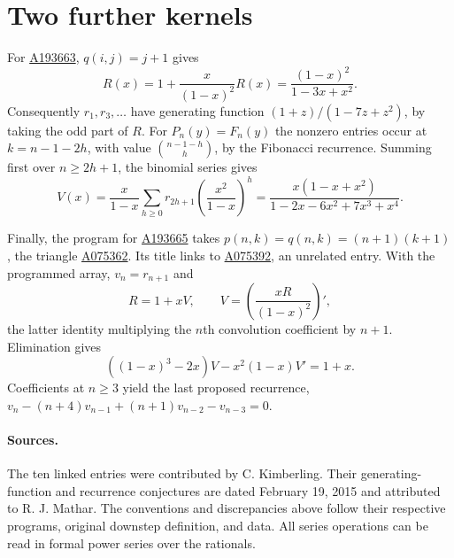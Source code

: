 \documentclass[11pt,letterpaper]{article}
\newcommand{\oeis}[1]{\href{https://oeis.org/A#1}{A#1}}
\begin{document}
\section{Two further kernels}
For \oeis{193663}, $q(i,j)=j+1$ gives
\[
 R(x)=1+\frac{x}{(1-x)^2}R(x)=\frac{(1-x)^2}{1-3x+x^2}.
\]
Consequently $r_1,r_3,\ldots$ have generating function $(1+z)/(1-7z+z^2)$, by taking the odd part of $R$. For $P_n(y)=F_n(y)$ the nonzero entries occur at $k=n-1-2h$, with value $\binom{n-1-h}{h}$, by the Fibonacci recurrence. Summing first over $n\ge2h+1$, the binomial series gives
\[
 V(x)=\frac{x}{1-x}\sum_{h\ge0}r_{2h+1}
                  \left(\frac{x^2}{1-x}\right)^h
     =\frac{x(1-x+x^2)}{1-2x-6x^2+7x^3+x^4}.
\]

Finally, the program for \oeis{193665} takes $p(n,k)=q(n,k)=(n+1)(k+1)$, the triangle \oeis{075362}. Its title links to \oeis{075392}, an unrelated entry. With the programmed array, $v_n=r_{n+1}$ and
\[
  R=1+xV,\qquad V=\left(\frac{xR}{(1-x)^2}\right)' ,
\]
the latter identity multiplying the $n$th convolution coefficient by $n+1$. Elimination gives
\[
 ((1-x)^3-2x)V-x^2(1-x)V'=1+x.
\]
Coefficients at $n\ge3$ yield the last proposed recurrence,
$v_n-(n+4)v_{n-1}+(n+1)v_{n-2}-v_{n-3}=0$.

\paragraph{Sources.}
The ten linked entries were contributed by C. Kimberling. Their generating-function and recurrence conjectures are dated February 19, 2015 and attributed to R. J. Mathar. The conventions and discrepancies above follow their respective programs, original downstep definition, and data. All series operations can be read in formal power series over the rationals.
\end{document}
